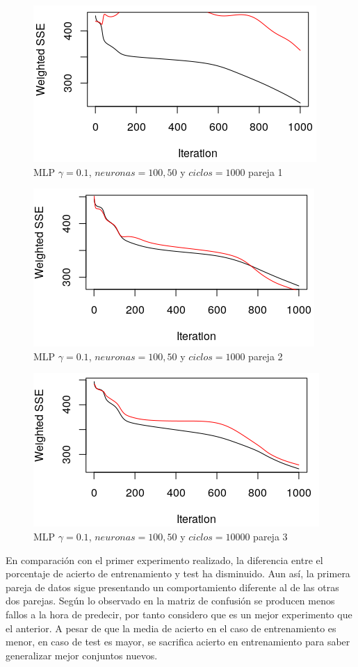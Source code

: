 \documentclass[11pt,spanish,listoffigures,listoftables]{workluis}
\begin{document}
\begin{figure}[H]
\centering
\includegraphics[scale=0.5]{01100501}
\caption{MLP $\gamma = 0.1$, $neuronas = 100,50$ y $ciclos = 1000$ pareja 1}
\end{figure} 

\begin{figure}[H]
\centering
\includegraphics[scale=0.5]{01100502}
\caption{MLP $\gamma = 0.1$, $neuronas = 100,50$ y $ciclos = 1000$ pareja 2}
\end{figure} 

\begin{figure}[H]
\centering
\includegraphics[scale=0.5]{01100503}
\caption{MLP $\gamma = 0.1$, $neuronas = 100,50$ y $ciclos = 10000$ pareja 3}
\end{figure} 

\par En comparación con el primer experimento realizado, la diferencia entre el porcentaje de acierto de entrenamiento y test ha disminuido. Aun así, la primera pareja de datos sigue presentando un comportamiento diferente al de las otras dos parejas. Según lo observado en la matriz de confusión se producen menos fallos a la hora de predecir, por tanto considero que es un mejor experimento que el anterior. A pesar de que la media de acierto en el caso de entrenamiento es menor, en caso de test es mayor, se sacrifica acierto en entrenamiento para saber generalizar mejor conjuntos nuevos.
\end{document}
